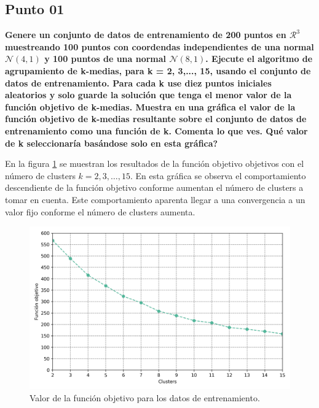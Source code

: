 \subsection*{Punto 01}

\textbf{Genere un conjunto de datos de entrenamiento de 200 puntos en $\mathcal{R}^3$ muestreando 100 puntos con coordendas independientes de una normal $\mathcal{N}(4,1)$ y 100 puntos de una normal $\mathcal{N}(8,1)$. Ejecute el algoritmo de agrupamiento de k-medias, para k = 2, 3,..., 15, usando el conjunto de datos de entrenamiento. Para cada k use diez puntos iniciales aleatorios y solo guarde la solución que tenga el menor valor de la función objetivo de k-medias. Muestra en una gráfica el valor de la función objetivo de k-medias resultante sobre el conjunto de datos de entrenamiento como una función de k. Comenta lo que ves. Qué valor de k seleccionaría basándose solo en esta gráfica?}

En la figura \ref{fig:problema_03_train_scores} se muestran los resultados de la función objetivo objetivos con el número de clusters $k=2,3,\dots,15$. En esta gráfica se observa el comportamiento descendiente de la función objetivo conforme aumentan el número de clusters a tomar en cuenta. Este comportamiento aparenta llegar a una convergencia a un valor fijo conforme el número de clusters aumenta.

\begin{figure}[H]
    \centering
    \includegraphics[width=12cm]{Graphics/Problema_03/train_scores.png}
    \caption{Valor de la función objetivo para los datos de entrenamiento.}
    \label{fig:problema_03_train_scores}
\end{figure}